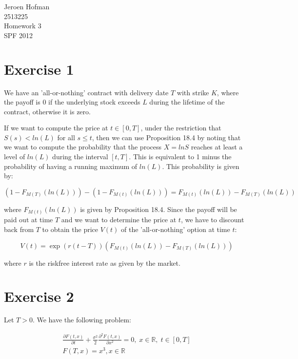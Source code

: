 \documentclass[11pt,a4paper,onecolumn]{article}
\begin{document}
\captionsetup{width=0.8\textwidth}
\thispagestyle{empty}

{\Huge Jeroen Hofman \\}
{\Large 2513225 \\
Homework 3 \\
SPF 2012}

\section{Exercise 1}

We have an 'all-or-nothing' contract with delivery date $T$ with strike $K$, where the payoff is 0 if the underlying stock exceeds $L$ during the lifetime of the contract, otherwise it is zero.

If we want to compute the price at $t \in [0,T]$, under the restriction that $S(s) < ln(L)$ for all $s \leq t$, then we can use Proposition 18.4 by noting that we want to compute the probability that the process $X = lnS$ reaches at least a level of $ln(L)$ during the interval $[t,T]$. This is equivalent to 1 minus the probability of having a running maximum of $ln(L)$. This probability is given by:

\begin{equation*}
  (1 - F_{M(T)}(ln(L))) - (1 - F_{M(t)}(ln(L))) = F_{M(t)}(ln(L)) - F_{M(T)}(ln(L))
\end{equation*}

where $F_{M(t)}(ln(L))$ is given by Proposition 18.4.
Since the payoff will be paid out at time $T$ and we want to determine the price at $t$, we have to discount back from $T$ to obtain the price $V(t)$ of the 'all-or-nothing' option at time $t$:

\begin{equation*}
  V(t) = \exp{(r(t-T))}(F_{M(t)}(ln(L)) - F_{M(T)}(ln(L)))
\end{equation*}

where $r$ is the riskfree interest rate as given by the market.

\section{Exercise 2}

Let $T>0$. We have the following problem:

\begin{align*}
  \frac{\partial F(t,x)}{\partial t} + \frac{\sigma^2}{2}\frac{\partial^2 F(t,x)}{\partial x^2} = 0, \; x \in \mathbb{R}, \; t \in [0,T] \\
  F(T,x) = x^3, x \in \mathbb{R}
\end{align*}
\end{document}

